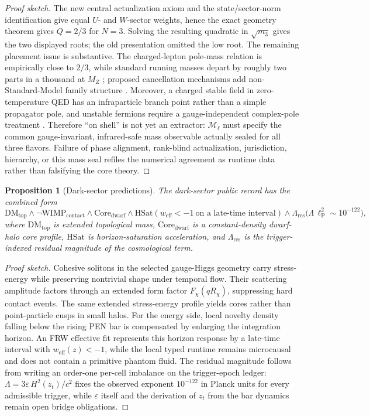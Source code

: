 \documentclass[11pt]{article}
\theoremstyle{plain}
\newtheorem{proposition}[theorem]{Proposition}
\theoremstyle{definition}
\theoremstyle{remark}
\newenvironment{proofsketch}{\begin{proof}[Proof sketch]}{\end{proof}}
\begin{document}
\begin{proofsketch}
The new central actualization axiom and the state/sector-norm identification give equal \(U\)- and \(W\)-sector weights, hence the exact geometry theorem gives \(Q=2/3\) for \(N=3\). Solving the resulting quadratic in \(\sqrt{m_3}\) gives the two displayed roots; the old presentation omitted the low root. The remaining placement issue is substantive. The charged-lepton pole-mass relation is empirically close to \(2/3\), while standard running masses depart by roughly two parts in a thousand at \(M_Z\) \cite{xing-koide}; proposed cancellation mechanisms add non-Standard-Model family structure \cite{sumino-koide}. Moreover, a charged stable field in zero-temperature QED has an infraparticle branch point rather than a simple propagator pole, and unstable fermions require a gauge-independent complex-pole treatment \cite{weldon-shell,kniehl-sirlin}. Therefore ``on shell'' is not yet an extractor: \(\mathcal M_\ell\) must specify the common gauge-invariant, infrared-safe mass observable actually sealed for all three flavors. Failure of phase alignment, rank-blind actualization, jurisdiction, hierarchy, or this mass seal refiles the numerical agreement as runtime data rather than falsifying the core theory.
\end{proofsketch}

\begin{proposition}[Dark-sector predictions]
The dark-sector public record has the combined form
\[
\mathrm{DM}_{\mathrm{top}} \wedge
\neg \mathrm{WIMP}_{\mathrm{contact}} \wedge
\mathrm{Core}_{\mathrm{dwarf}}
\wedge
\mathrm{HSat}(w_{\mathrm{eff}}<-1\ \text{on a late-time interval})
\wedge
\Lambda_{\mathrm{res}}\bigl(\Lambda\,\ell_{\mathrm{P}}^2\sim 10^{-122}\bigr),
\]
where \(\mathrm{DM}_{\mathrm{top}}\) is extended topological mass, \(\mathrm{Core}_{\mathrm{dwarf}}\) is a constant-density dwarf-halo core profile, \(\mathrm{HSat}\) is horizon-saturation acceleration, and \(\Lambda_{\mathrm{res}}\) is the trigger-indexed residual magnitude of the cosmological term.
\end{proposition}

\begin{proofsketch}
Cohesive solitons in the selected gauge-Higgs geometry carry stress-energy while preserving nontrivial shape under temporal flow. Their scattering amplitude factors through an extended form factor \(F_\chi(qR_\chi)\), suppressing hard contact events. The same extended stress-energy profile yields cores rather than point-particle cusps in small halos. For the energy side, local novelty density falling below the rising PEN bar is compensated by enlarging the integration horizon. An FRW effective fit represents this horizon response by a late-time interval with \(w_{\mathrm{eff}}(z)<-1\), while the local typed runtime remains microcausal and does not contain a primitive phantom fluid. The residual magnitude follows from writing an order-one per-cell imbalance on the trigger-epoch ledger: \(\Lambda = 3\varepsilon\,H^2(z_t)/c^2\) fixes the observed exponent \(10^{-122}\) in Planck units for every admissible trigger, while \(\varepsilon\) itself and the derivation of \(z_t\) from the bar dynamics remain open bridge obligations.
\end{proofsketch}
\end{document}
